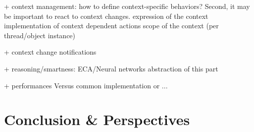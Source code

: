 \documentclass[a4paper]{article}
\begin{document}
+ context management: how to define context-specific behaviors? Second, it may be important to react to context changes.
  expression of the context
  implementation of context dependent actions
  scope of the context (per thread/object instance)

+ context change notifications

+ reasoning/smartness: ECA/Neural networks
abstraction of this part


+ performances
  Versus common implementation or ...
  

\section{Conclusion \& Perspectives}

%
%



\end{document}

